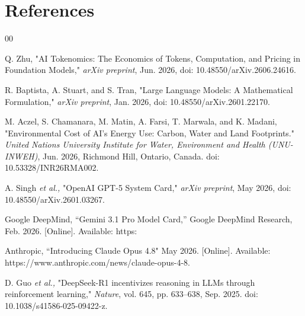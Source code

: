 \documentclass[journal,twoside,web]{ieeecolor_no_firstpage_logo}
\begin{document}
\section*{References}
\begin{thebibliography}{00}


 Q. Zhu, "AI Tokenomics: The Economics of Tokens, Computation, and Pricing in Foundation Models," \textit{arXiv preprint}, Jun. 2026, doi: 10.48550/arXiv.2606.24616.

 R. Baptista, A. Stuart, and S. Tran, "Large Language Models: A Mathematical Formulation," \textit{arXiv preprint}, Jan. 2026, doi: 10.48550/arXiv.2601.22170.

 M. Aczel, S. Chamanara, M. Matin, A. Farsi, T. Marwala, and K. Madani, "Environmental Cost of AI's Energy Use: Carbon, Water and Land Footprints." \textit{United Nations University Institute for Water, Environment and Health (UNU-INWEH)}, Jun. 2026, Richmond Hill, Ontario, Canada. doi: 10.53328/INR26RMA002.

 A. Singh \textit{et al.,} "OpenAI GPT-5 System Card," \textit{arXiv preprint}, May 2026, doi: 10.48550/arXiv.2601.03267.

 Google DeepMind, “Gemini 3.1 Pro Model Card,” Google DeepMind Research, Feb. 2026. [Online]. Available: https:

 Anthropic, “Introducing Claude Opus 4.8" May 2026. [Online]. Available: https://www.anthropic.com/news/claude-opus-4-8.

 D. Guo \textit{et al.,} "DeepSeek-R1 incentivizes reasoning in LLMs through reinforcement learning," \textit{Nature}, vol. 645, pp. 633–638, Sep. 2025. doi: 10.1038/s41586-025-09422-z.


\end{thebibliography}
\end{document}
